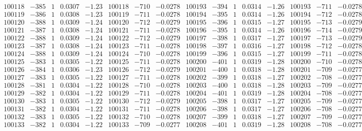 \documentclass[11pt,reqno,a4letter]{article}
\numberwithin{figure}{section}
\numberwithin{table}{section}
\theoremstyle{plain}
\numberwithin{theorem}{section}
\theoremstyle{definition}
\begin{document}
\begin{table}[ht!]
\begin{equation*}
{\begin{array}{ccccc|ccc||ccccc|ccc}
100118 & -385 & 1 & 0.0307 & -1.23 & 100118 & -710 & -0.0278 & 100193 & -394 & 1 & 0.0314 & -1.26 & 100193 & -711 & -0.0278  \\
100119 & -386 & 1 & 0.0308 & -1.23 & 100119 & -711 & -0.0278 & 100194 & -395 & 1 & 0.0314 & -1.26 & 100194 & -712 & -0.0278  \\
100120 & -388 & 1 & 0.0309 & -1.24 & 100120 & -712 & -0.0279 & 100195 & -396 & 1 & 0.0315 & -1.27 & 100195 & -713 & -0.0279  \\
100121 & -387 & 1 & 0.0308 & -1.24 & 100121 & -711 & -0.0278 & 100196 & -395 & 1 & 0.0314 & -1.26 & 100196 & -714 & -0.0279  \\
100122 & -388 & 1 & 0.0309 & -1.24 & 100122 & -712 & -0.0279 & 100197 & -398 & 1 & 0.0317 & -1.27 & 100197 & -713 & -0.0279  \\
100123 & -387 & 1 & 0.0308 & -1.24 & 100123 & -711 & -0.0278 & 100198 & -397 & 1 & 0.0316 & -1.27 & 100198 & -712 & -0.0278  \\
100124 & -388 & 1 & 0.0309 & -1.24 & 100124 & -710 & -0.0278 & 100199 & -396 & 1 & 0.0315 & -1.27 & 100199 & -711 & -0.0278  \\
100125 & -383 & 1 & 0.0305 & -1.22 & 100125 & -711 & -0.0278 & 100200 & -401 & 1 & 0.0319 & -1.28 & 100200 & -710 & -0.0278  \\
100126 & -384 & 1 & 0.0306 & -1.23 & 100126 & -712 & -0.0279 & 100201 & -400 & 1 & 0.0318 & -1.28 & 100201 & -709 & -0.0277  \\
100127 & -383 & 1 & 0.0305 & -1.22 & 100127 & -711 & -0.0278 & 100202 & -399 & 1 & 0.0318 & -1.27 & 100202 & -708 & -0.0277  \\
100128 & -381 & 1 & 0.0304 & -1.22 & 100128 & -710 & -0.0278 & 100203 & -400 & 1 & 0.0318 & -1.28 & 100203 & -709 & -0.0277  \\
100129 & -382 & 1 & 0.0304 & -1.22 & 100129 & -711 & -0.0278 & 100204 & -401 & 1 & 0.0319 & -1.28 & 100204 & -708 & -0.0277  \\
100130 & -383 & 1 & 0.0305 & -1.22 & 100130 & -712 & -0.0279 & 100205 & -398 & 1 & 0.0317 & -1.27 & 100205 & -709 & -0.0277  \\
100131 & -382 & 1 & 0.0304 & -1.22 & 100131 & -711 & -0.0278 & 100206 & -398 & 1 & 0.0317 & -1.27 & 100206 & -708 & -0.0277  \\
100132 & -383 & 1 & 0.0305 & -1.22 & 100132 & -710 & -0.0278 & 100207 & -399 & 1 & 0.0318 & -1.27 & 100207 & -709 & -0.0277  \\
100133 & -382 & 1 & 0.0304 & -1.22 & 100133 & -709 & -0.0277 & 100208 & -401 & 1 & 0.0319 & -1.28 & 100208 & -708 & -0.0277  \\

\end{array}}
\end{equation*}
\end{table}
\end{document}
